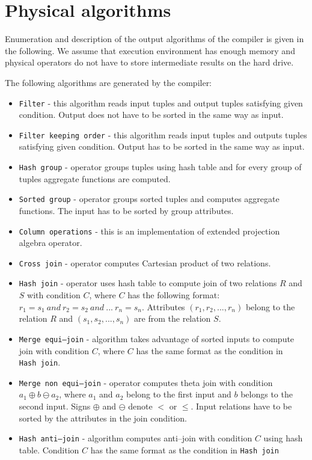 \section{Physical algorithms}


Enumeration and description of the output algorithms of the compiler is given in the following.
We assume that execution environment has enough memory and physical operators do not have to store intermediate results on the hard drive.

The following algorithms are generated by the compiler:
\begin{itemize}
\item \texttt{Filter} - this algorithm reads input tuples and output tuples satisfying given condition. Output does not have to be sorted in the same way as input.
\item \texttt{Filter~keeping~order} - this algorithm reads input tuples and outputs tuples satisfying given condition. Output has to be sorted in the same way as input.
\item \texttt{Hash~group} - operator groups tuples using hash table and for every group of tuples aggregate functions are computed.
\item \texttt{Sorted~group} - operator groups sorted tuples and computes aggregate functions. The input has to be sorted by group attributes.
\item \texttt{Column~operations} - this is an implementation of extended projection algebra operator. 
\item \texttt{Cross~join} - operator computes Cartesian product of two relations.
\item \texttt{Hash~join} - operator uses hash table to compute join of two relations $R$ and $S$ with condition $C$, where $C$ has the following format: $r_1=s_1~and~r_2=s_2~and~...~r_n=s_n$. Attributes $(r_1,r_2,...,r_n)$ belong to the relation $R$ and $(s_1,s_2,...,s_n)$ are from the relation $S$.
\item \texttt{Merge~equi--join} - algorithm takes advantage of sorted inputs to compute join with condition $C$, where $C$ has the same format as the condition in \texttt{Hash~join}. 
\item \texttt{Merge~non~equi--join} - operator computes theta join with condition $a_1\oplus b \ominus a_2$, where $a_1$ and $a_2$ belong to the first input and $b$ belongs to the second input. Signs $\oplus$ and $\ominus$ denote $<$ or $\leq$. Input relations have to be sorted by the attributes in the join condition.
\item \texttt{Hash~anti--join} -  algorithm computes anti--join with condition $C$  using hash table. Condition $C$ has the same format as the condition in \texttt{Hash~join}

\end{itemize}
